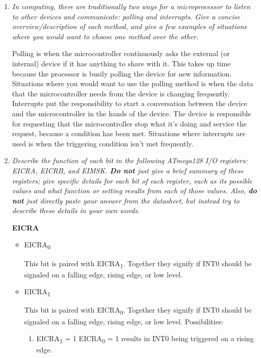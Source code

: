 \documentclass[12pt,letterpaper]{article}
\begin{document}
	\begin{enumerate}
		\item
		\textit{In computing, there are traditionally two ways for a microprocessor to listen to other devices and communicate: polling and interrupts. 
		Give a concise overview/description of each method, and give a few examples of situations where you would want to choose one method over the other.}
	
		Polling is when the microcontroller continuously asks the external (or internal) device if it has anything to share with it.
		This takes up time because the processor is busily polling the device for new information.
		Situations where you would want to use the polling method is when the data that the microcontroller needs from the device is changing frequently.
		Interrupts put the responsibility to start a conversation between the device and the microcontroller in the hands of the device.
		The device is responsible for requesting that the microcontroller stop what it's doing and service the request, because a condition has been met.
		Situations where interrupts are used is when the triggering condition isn't met frequently.
		


		
		\item 
		\textit{Describe the function of each bit in the following ATmega128 I/O registers: EICRA, EICRB, and EIMSK. 
		\textbf{Do not} just give a brief summary of these registers; give specific details for each bit of each register, such as its possible values and what function or setting results from each of those values. 
		Also, \textbf{do not} just directly paste your answer from the datasheet, but instead try to describe these details in your own words.}
	
	\textbf{EICRA}
	
		\begin{itemize}
			\item
			EICRA\textsubscript{0}
				
				This bit is paired with EICRA\textsubscript{1}.
				Together they signify if INT0 should be signaled on a falling edge, rising edge, or low level.
			
			\item 
			EICRA\textsubscript{1}
				
				This bit is paired with EICRA\textsubscript{0}.
				Together they signify if INT0 should be signaled on a falling edge, rising edge, or low level.
				Possibilities: 
				\begin{enumerate}
					\item
					EICRA\textsubscript{1} = 1 EICRA\textsubscript{0} = 1 results in INT0 being triggered on a rising edge.
					

\end{enumerate}
\end{itemize}
\end{enumerate}
\end{document}
